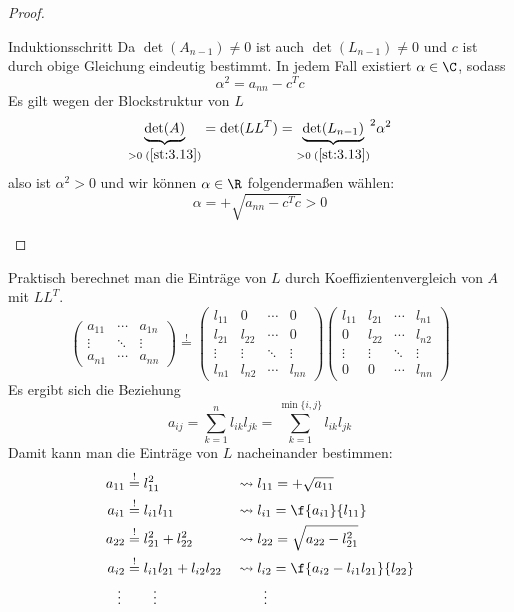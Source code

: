 \documentclass{mycourse}
\begin{document}
\begin{st}
\begin{proof}
\begin{seg}{Induktionsschritt}
		Da $\det (A_{n-1}) \neq 0$ ist auch $\det(L_{n-1})\neq 0$ und $c$ ist durch obige Gleichung eindeutig bestimmt.
		In jedem Fall existiert $\alpha \in \C$, sodass
		\[
			\alpha^2 = a_{nn}-c^Tc
		\]
		Es gilt wegen der Blockstruktur von $L$ 
		\[
			\underbrace{\det (A)}_{>0\; (\ref{st:3.13})} = \det (LL^T) = {\underbrace{\det (L_{n-1})}_{>0\;(\ref{st:3.13})}}^2 \alpha^2
		\]
		also ist $\alpha^2 >0$ und wir können $\alpha \in \R$ folgendermaßen wählen:
		\[
			\alpha = +\sqrt{a_{nn}-c^Tc} > 0
		\]
	\end{seg}
	\end{proof}
\end{st}

Praktisch berechnet man die Einträge von $L$ durch Koeffizientenvergleich von $A$ mit $LL^T$.
\[
	\begin{pmatrix}
		a_{11} & \cdots & a_{1n}\\
		\vdots & \ddots & \vdots \\
		a_{n1} & \cdots & a_{nn}
	\end{pmatrix}
	\stackrel !=
	\begin{pmatrix}
		l_{11} & 0 & \cdots & 0\\
		l_{21} & l_{22} & \cdots & 0\\
		\vdots & \vdots & \ddots & \vdots \\
		l_{n1} & l_{n2} & \cdots & l_{nn}
	\end{pmatrix}
	\begin{pmatrix}
		l_{11} & l_{21} & \cdots & l_{n1}\\
		0 & l_{22} & \cdots & l_{n2}\\
		\vdots & \vdots & \ddots & \vdots \\
		0 & 0 & \cdots & l_{nn}
	\end{pmatrix}
\]
Es ergibt sich die Beziehung
\[
	a_{ij} = \sum_{k=1}^n l_{ik}l_{jk} = \sum_{k=1}^{\min\{i,j\}}l_{ik}l_{jk}
\]
Damit kann man die Einträge von $L$ nacheinander bestimmen:
\begin{alignat*}{2}
	a_{11} &\stackrel != l_{11}^2 &&\leadsto l_{11} = +\sqrt{a_{11}}\\
	a_{i1} &\stackrel != l_{i1}l_{11} &&\leadsto l_{i1} = \f {a_{i1}}{l_{11}}\\
	a_{22} &\stackrel != l_{21}^2 + l_{22}^2 &&\leadsto l_{22} = \sqrt{a_{22}-l_{21}^2}\\
	a_{i2} &\stackrel != l_{i1}l_{21} + l_{i2}l_{22} &&\leadsto l_{i2} = \f {a_{i2}-l_{i1}l_{21}}{l_{22}}\\
	\vdots \; &\qquad \vdots && \qquad \vdots
\end{alignat*}
\end{document}
